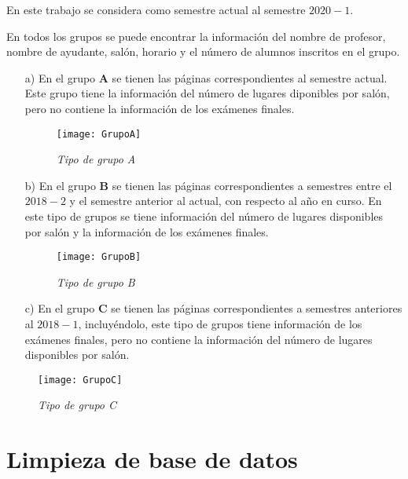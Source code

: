 En este trabajo se considera como semestre actual al semestre $2020-1$.

En todos los grupos se puede encontrar la información del nombre de profesor, nombre de ayudante, salón, horario y el número de alumnos inscritos en el grupo.

\begin{enumerate}
\item[a)] En el grupo \textbf{A} se tienen las páginas correspondientes al semestre actual. Este grupo tiene la información del número de lugares diponibles por salón, pero no contiene la información de los exámenes finales.

\begin{figure}[H]
\centering
\texttt{[image: GrupoA]} %
\caption{\textit{Tipo de grupo A}}
\end{figure}


\item[b)] En el grupo \textbf{B} se tienen las páginas correspondientes a semestres entre el $2018-2$ y el semestre anterior al actual, con respecto al año en curso. En este tipo de grupos se tiene información del número de lugares disponibles por salón y la información de los exámenes finales.

\begin{figure}[H]
\centering
\texttt{[image: GrupoB]} %
\caption{\textit{Tipo de grupo B}}
\end{figure}

\item[c)] En el grupo \textbf{C} se tienen las páginas correspondientes a semestres anteriores al $2018-1$, incluyéndolo, este tipo de grupos tiene información de los exámenes finales, pero no contiene la información del número de lugares disponibles por salón.
\end{enumerate}

\begin{figure}[H]
\centering
\texttt{[image: GrupoC]} %
\caption{\textit{Tipo de grupo C}}
\end{figure}

\section{Limpieza de base de datos}

